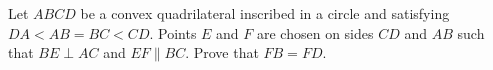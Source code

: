 Let $ABCD$ be a convex quadrilateral inscribed in a circle and satisfying $DA<AB=BC<CD$. Points $E$ and $F$ are chosen on sides $CD$ and $AB$ such that $BE\perp AC$ and $EF\parallel BC$. Prove that $FB=FD$.
